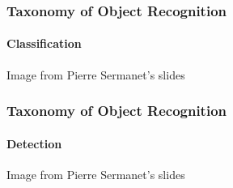\documentclass[xetex,professionalfont]{beamer}
\begin{document}

\begin{frame}
\frametitle{Taxonomy of Object Recognition}
\framesubtitle{Classification}

\begin{center}
    {\centering Image from Pierre Sermanet's slides}
\end{center}

\end{frame}


\begin{frame}
\frametitle{Taxonomy of Object Recognition}
\framesubtitle{Detection}

\begin{center}
    {\centering Image from Pierre Sermanet's slides}
\end{center}

\end{frame}

\end{document}
